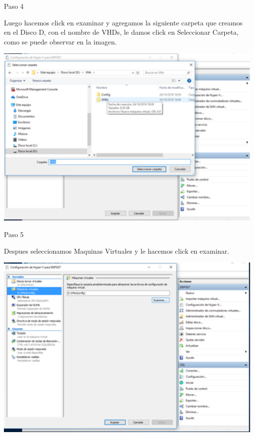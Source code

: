 	\begin{itemize}
	\begin{center}
 	   Paso 4
	\end{center}


   	 Luego hacemos click en examinar y agregamos la siguiente carpeta que creamos en el Disco D, con el nombre de VHDs, le damos click en Seleccionar Carpeta, como se puede observar en la imagen.\\
	\begin{center}
	\includegraphics[width=15cm]{./Imagenes/imagen4} 
	\end{center}


	\end{itemize}
	
	\begin{itemize}
	\begin{center}
    Paso 5
	\end{center}


   Despues seleccionamos Maquinas Virtuales y le hacemos click en examinar.\\
	\begin{center}
	\includegraphics[width=15cm]{./Imagenes/imagen5} 
	\end{center}


	\end{itemize} 


